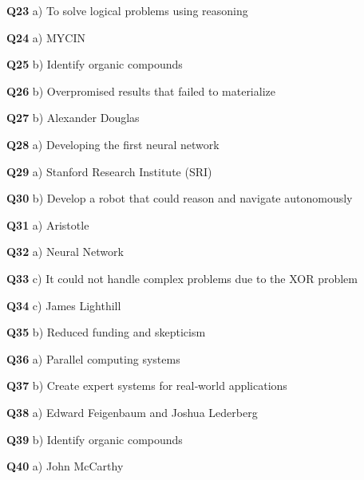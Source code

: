 \textbf{Q23} a) To solve logical problems using reasoning\par
\textbf{Q24} a) MYCIN\par
\textbf{Q25} b) Identify organic compounds\par
\textbf{Q26} b) Overpromised results that failed to materialize\par
\textbf{Q27} b) Alexander Douglas\par
\textbf{Q28} a) Developing the first neural network\par
\textbf{Q29} a) Stanford Research Institute (SRI)\par
\textbf{Q30} b) Develop a robot that could reason and navigate autonomously\par
\textbf{Q31} a) Aristotle\par
\textbf{Q32} a) Neural Network\par
\textbf{Q33} c) It could not handle complex problems due to the XOR problem\par
\textbf{Q34} c) James Lighthill\par
\textbf{Q35} b) Reduced funding and skepticism\par
\textbf{Q36} a) Parallel computing systems\par
\textbf{Q37} b) Create expert systems for real‑world applications\par
\textbf{Q38} a) Edward Feigenbaum and Joshua Lederberg\par
\textbf{Q39} b) Identify organic compounds\par
\textbf{Q40} a) John McCarthy\par